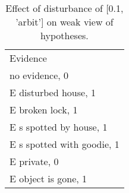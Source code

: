 \begin{table}\begin{tabular}{l}\toprule\multirow{2}{*}{Evidence} \\\\\midrule
no evidence, 0 & \\E disturbed house, 1 & \\E broken lock, 1 & \\E s spotted by house, 1 & \\E s spotted with goodie, 1 & \\E private, 0 & \\E object is gone, 1 & \\\bottomrule\end{tabular}\caption{Effect of disturbance of [0.1, 'arbit'] on weak view of hypotheses.}\end{table}